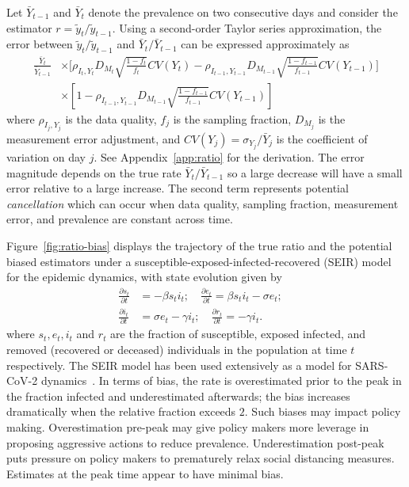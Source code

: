 \documentclass[11pt]{amsart}
\numberwithin{equation}{section}
\theoremstyle{plain}
\begin{document}
 Let $\bar Y_{t-1}$ and $\bar Y_{t}$ denote the prevalence on two consecutive days and consider the estimator $r = \tilde y_t / \tilde y_{t-1}$.  Using a second-order Taylor series approximation, the error between ${\tilde y_t}/{\tilde y_{t-1}}$ and ${\bar Y_{t}}/{\bar Y_{t-1}}$ can be expressed approximately as
 $$
 \begin{aligned}
 \frac{\bar Y_t}{\bar Y_{t-1}} &\times \bigg[ \rho_{I_t,Y_t} D_{M_t} \sqrt{\frac{1-f_t}{f_t}} CV (Y_t)  -\rho_{I_{t-1},Y_{t-1}} D_{M_{t-1}} \sqrt{\frac{1-f_{t-1}}{f_{t-1}}} CV (Y_{t-1}) \bigg] \\
 &\times \left[ 1 - \rho_{I_{t-1},Y_{t-1}} D_{M_{t-1}} \sqrt{\frac{1-f_{t-1}}{f_{t-1}}} CV (Y_{t-1}) \right]
 \end{aligned}
 $$
 where $\rho_{I_j, Y_j}$ is the data quality, $f_j$ is the sampling fraction, $D_{M_j}$ is the measurement error adjustment, and $CV(Y_j) = \sigma_{Y_j}/ \bar Y_j$ is the coefficient of variation on day $j$.  See Appendix~\ref{app:ratio} for the derivation. The error magnitude depends on the true rate $\bar Y_{t} / \bar Y_{t-1}$ so a large decrease will have a small error relative to a large increase. The second term represents potential \emph{cancellation} which can  occur when data quality, sampling fraction, measurement error, and prevalence are constant across time.

 Figure~\ref{fig:ratio-bias} displays the trajectory of the true ratio and the potential biased estimators under a susceptible-exposed-infected-recovered (SEIR) model~\citep{Pastor2001,Newman2002,Parshani2010} for the epidemic dynamics, with state evolution given by
 \begin{align}
 \frac{\partial s_t}{\partial t} &= - \beta s_t i_t; \quad \frac{\partial e_t}{\partial t} = \beta s_t i_t - \sigma e_t; \quad \label{eq:seir} \\
 \frac{\partial i_t}{\partial t} &= \sigma e_t - \gamma i_t; \quad
 \frac{\partial r_t}{\partial t} = - \gamma i_t. \nonumber
\end{align}
 where $s_t, e_t, i_t$ and $r_t$ are the fraction of susceptible, exposed infected, and removed (recovered or deceased) individuals in the population at time $t$ respectively.  The SEIR model has been used extensively as a model for SARS-CoV-2 dynamics~\cite{Song2020}.  In terms of bias, the rate is overestimated prior to the peak in the fraction infected and underestimated afterwards; the bias increases dramatically when the relative fraction exceeds $2$.  Such biases may impact policy making.  Overestimation pre-peak may give policy makers more leverage in proposing aggressive actions to reduce prevalence.  Underestimation post-peak puts pressure on policy makers to prematurely relax social distancing measures.  Estimates at the peak time appear to have minimal bias.
\end{document}
